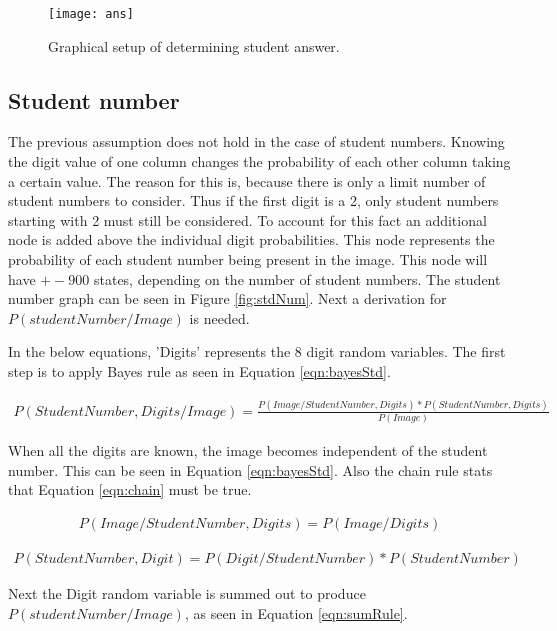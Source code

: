 \begin{figure}
  \centering
  \texttt{[image: ans]}\\
  \caption{Graphical setup of determining student answer.}
  \label{fig:ans}
\end{figure}

\subsection{Student number}

The previous assumption does not hold in the case of student numbers. Knowing the digit value of one column changes the probability of each other column taking a certain value. The reason for this is, because there is only a limit number of student numbers to consider. Thus if the first digit is a 2, only student numbers starting with 2 must still be considered. To account for this fact an additional node is added above the individual digit probabilities. This node represents the probability of each student number being present in the image. This node will have $+- 900$ states, depending on the number of student numbers. The student number graph can be seen in Figure \ref{fig:stdNum}. Next a derivation for $P(studentNumber/Image)$ is needed. 

In the below equations, 'Digits' represents the 8 digit random variables. The first step is to apply Bayes rule as seen in Equation \ref{eqn:bayesStd}.

\begin{align}
  P(StudentNumber,Digits/Image) =  \frac{P(Image/StudentNumber,Digits)*P(StudentNumber,Digits)}{P(Image)}
\label{eqn:bayesStd}
\end{align}

When all the digits are known, the image becomes independent of the student number. This can be seen in Equation \ref{eqn:bayesStd}. Also the chain rule stats that Equation \ref{eqn:chain} must be true.

\begin{align}
  P(Image/StudentNumber,Digits) = P(Image/Digits)
\label{eqn:digitInd}
\end{align}

\begin{align}
  P(StudentNumber,Digit) = P(Digit/StudentNumber)*P(StudentNumber)
\label{eqn:chain}
\end{align}

Next the Digit random variable is summed out to produce $P(studentNumber/Image)$, as seen in Equation \ref{eqn:sumRule}.

